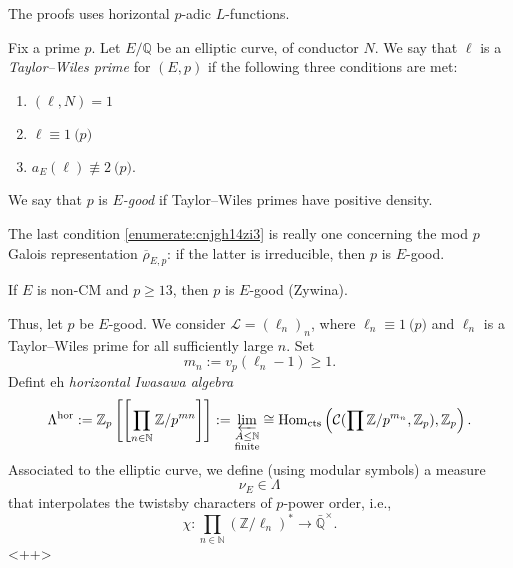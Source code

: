 \documentclass[reqno]{amsart} 
\begin{document}
The proofs uses horizontal $p$-adic $L$-functions.

\begin{definition}
  Fix a prime $p$.  Let $E/\mathbb{Q}$ be an elliptic curve, of conductor $N$.  We say that $\ell$ is a \emph{Taylor--Wiles prime} for $(E, p)$ if the following three conditions are met:
  \begin{enumerate}
  \item\label{enumerate:cnjgh144b4} $(\ell, N) = 1$
  \item\label{enumerate:cnjgh142qb} $\ell \equiv 1 \pod{p}$
  \item\label{enumerate:cnjgh14zi3} $a_E(\ell) \not \equiv 2 \pod{p}$.
  \end{enumerate}
  We say that $p$ is $E$\emph{-good} if Taylor--Wiles primes have positive density.
\end{definition}
\begin{remark}
  The last condition \eqref{enumerate:cnjgh14zi3} is really one concerning the mod $p$ Galois representation $\overline{\rho}_{E, p}$: if the latter is irreducible, then $p$ is $E$-good.
\end{remark}
\begin{remark}
  If $E$ is non-CM and $p \geq 13$, then $p$ is $E$-good (Zywina).
\end{remark}
Thus, let $p$ be $E$-good.  We consider $\mathcal{L} =(\ell_n)_n$, where $\ell_n \equiv 1 \pod{p}$ and $\ell_n$ is a Taylor--Wiles prime for all sufficiently large $n$.  Set
\begin{equation*}
  m_n := v_p(\ell_n - 1) \geq 1.
\end{equation*}
Defint eh \emph{horizontal Iwasawa algebra}
\begin{equation*}
  \Lambda^{\mathrm{hor}}
  :=
  \mathbb{Z}_p
  \left[ \left[ \prod_{ n \in \mathbb{N}} \mathbb{Z} / p^{m n} \right] \right]
  :=
  \varprojlim_{
    \substack{
      A \leq \mathbb{N}  \\
      \text{finite}      
    }
  }
  \cong \operatorname{Hom}_{\mathrm{cts}} \left( \mathcal{C}(\prod \mathbb{Z} / p^{m_n}, \mathbb{Z}_p), \mathbb{Z}_p \right).
\end{equation*}
Associated to the elliptic curve, we define (using modular symbols) a measure
\begin{equation*}
  \nu_E \in \Lambda^{\mathrm{}}
\end{equation*}
that interpolates the twistsby characters of $p$-power order, i.e.,
\begin{equation*}
  \chi : \prod_{n \in \mathbb{N}} \left( \mathbb{Z} / \ell_n \right)^\ast \rightarrow \bar{\mathbb{Q}} ^\times.
\end{equation*}<++>
\end{document}
